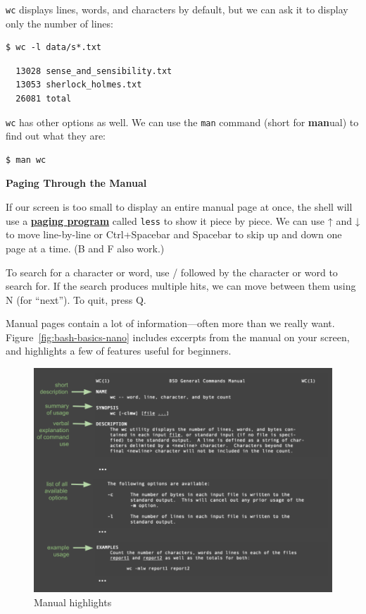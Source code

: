 \documentclass[
]{krantz}
\renewenvironment{quote}{\begin{VF}}{\end{VF}}
\newcommand{\gref}[2]{\hyperlink{#2}{\textbf{#1}}}
\begin{document}
\texttt{wc} displays lines, words, and characters by default,
but we can ask it to display only the number of lines:

\begin{verbatim}
$ wc -l data/s*.txt
\end{verbatim}

\begin{verbatim}
  13028 sense_and_sensibility.txt
  13053 sherlock_holmes.txt
  26081 total
\end{verbatim}

\texttt{wc} has other options as well.
We can use the \texttt{man} command (short for \textbf{man}ual)
to find out what they are:

\begin{verbatim}
$ man wc
\end{verbatim}

\begin{quote}
\textbf{Paging Through the Manual}

If our screen is too small to display an entire manual page at once,
the shell will use a \gref{paging program}{pager} called \texttt{less} to show it
piece by piece.
We can use ↑ and ↓ to move line-by-line
or Ctrl+Spacebar and Spacebar
to skip up and down one page at a time.
(B and F also work.)

To search for a character or word,
use / followed by the character or word to search for.
If the search produces multiple hits,
we can move between them using N (for ``next'').
To quit, press Q.
\end{quote}

Manual pages contain a lot of information---often more than we really want.
Figure~\ref{fig:bash-basics-nano}
includes excerpts from the manual on your screen,
and highlights a few of features useful for beginners.

\begin{figure}

{\centering \includegraphics[width=1\linewidth]{figures/bash-basics/man-callouts} 

}

\caption{Manual highlights}\label{fig:bash-basics-manual}
\end{figure}
\end{document}
